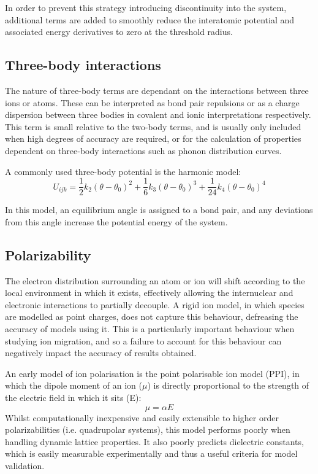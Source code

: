 In order to prevent this strategy introducing discontinuity into the system, additional terms are added to smoothly reduce the interatomic potential and associated energy derivatives to zero at the threshold radius. %


\subsection{Three-body interactions}
The nature of three-body terms are dependant on the interactions between three ions or atoms.
These can be interpreted as bond pair repulsions or as a charge dispersion between three bodies in covalent and ionic interpretations respectively.
This term is small relative to the two-body terms, and is usually only included when high degrees of accuracy are required, or for the calculation of properties dependent on three-body interactions such as phonon distribution curves.

A commonly used three-body potential is the harmonic model:
\begin{equation}
  U_{ijk} = \frac{1}{2}k_2(\theta-\theta_0)^2   + \frac{1}{6}k_3(\theta-\theta_0)^3    + \frac{1}{24}k_4(\theta-\theta_0)^4
  \label{eq:threebody}
\end{equation}

In this model, an equilibrium angle is assigned to a bond pair, and any deviations from this angle increase the potential energy of the system.

\subsection{Polarizability}
The electron distribution surrounding an atom or ion will shift according to the local environment in which it exists, effectively allowing the internuclear and electronic interactions to partially decouple.
A rigid ion model, in which species are modelled as point charges, does not capture this behaviour, defreasing the accuracy of models using it.
This is a particularly important behaviour when studying ion migration, and so a failure to account for this behaviour can negatively impact the accuracy of results obtained.

An early model of ion polarisation is the point polarisable ion model (PPI), in which the dipole moment of an ion ($\mu$) is directly proportional to the strength of the electric field in which it sits (E):
\begin{equation}
\mu = \alpha E
\end{equation}
Whilst computationally inexpensive and easily extensible to higher order polarizabilities (i.e. quadrupolar systems), this model performs poorly when handling dynamic lattice properties.
It also poorly predicts dielectric constants, which is easily measurable experimentally and thus a useful criteria for model validation.

